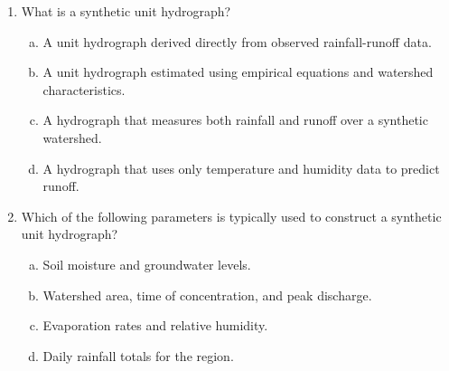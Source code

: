 \documentclass[12pt]{article}
\begin{document}
\begin{enumerate}
\begin{enumerate}[a)]
\begin{figure}[htbp]
   \caption{3-hour event comprised of 3 consecutive 1-hour events.}
   \label{fig:UnitHydrographOutput}
\end{figure}
\item What is the total volume (in $ft^3$) of runoff anticipated for the storm depicted in Figure \ref{fig:UnitHydrographOutput}?  \\
~\\
~\\
~\\
~\\
\item Plot the response to the 3 consecutive 1-hour events with the intensities indicated in Figure \ref{fig:UnitHydrographOutput}.
\end{enumerate}



\clearpage

\item What is a synthetic unit hydrograph?
\begin{enumerate}[a)]
\item A unit hydrograph derived directly from observed rainfall-runoff data.
\item A unit hydrograph estimated using empirical equations and watershed characteristics.
\item A hydrograph that measures both rainfall and runoff over a synthetic watershed.
\item A hydrograph that uses only temperature and humidity data to predict runoff.
\end{enumerate}

\item Which of the following parameters is typically used to construct a synthetic unit hydrograph?
\begin{enumerate}[a)]
\item Soil moisture and groundwater levels.
\item Watershed area, time of concentration, and peak discharge.
\item Evaporation rates and relative humidity.
\item Daily rainfall totals for the region.
\end{enumerate}



\end{enumerate}
\end{document}

